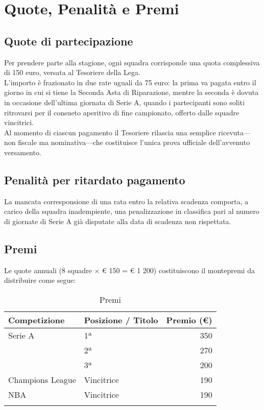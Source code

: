 \chapter{Quote, Penalità e Premi}
\label{cap:quote-penalita-premi}

\section{Quote di partecipazione}
\label{art:9.1}

Per prendere parte alla stagione, ogni squadra corrisponde una quota complessiva di 150 euro, versata al Tesoriere della Lega.\\
L’importo è frazionato in due rate uguali da 75 euro: la prima va pagata entro il giorno in cui si tiene la Seconda Asta di Riparazione, mentre la seconda è dovuta in occasione dell’ultima giornata di Serie A, quando i partecipanti sono soliti ritrovarsi per il consueto aperitivo di fine campionato, offerto dalle squadre vincitrici.\\
Al momento di ciascun pagamento il Tesoriere rilascia una semplice ricevuta—non fiscale ma nominativa—che costituisce l’unica prova ufficiale dell’avvenuto versamento.

\section{Penalità per ritardato pagamento}
\label{art:9.2}

La mancata corresponsione di una rata entro la relativa scadenza comporta, a carico della squadra inadempiente, una penalizzazione in classifica pari al numero di giornate di Serie A già disputate alla data di scadenza non rispettata.

\section{Premi}
\label{art:9.3}

Le quote annuali (8 squadre × € 150 = € 1 200) costituiscono il montepremi da distribuire come segue:

\begin{longtable}{|l|l|r|}
  \hline
  \textbf{Competizione} & \textbf{Posizione / Titolo} & \textbf{Premio (€)} \\
  \hline
  Serie A & 1ª & 350 \\
  & 2ª & 270 \\
  & 3ª & 200 \\ \hline
  Champions League & Vincitrice & 190 \\ \hline
  NBA & Vincitrice & 190 \\
  \hline
  \caption{Premi}
\end{longtable}

